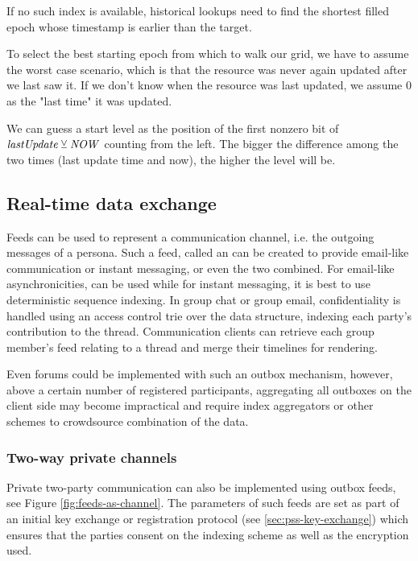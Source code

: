 If no such index is available, historical lookups need to find the shortest filled epoch whose timestamp is earlier than the target. 

To select the best starting epoch from which to walk our grid, we have to assume the worst case scenario, which is that the resource was never again updated after we last saw it. If we don't know when the resource was last updated, we assume 0 as the "last time" it was updated.

We can guess a start level as the position of the first nonzero bit of $\mathit{lastUpdate}\veebar \mathit{NOW}$ counting from the left. The bigger the difference among the two times (last update time and now), the higher the level will be.


\subsection{Real-time data exchange \statusyellow}\label{sec:feed-as-channel}

Feeds can be used to represent a communication channel, i.e. the outgoing messages of a persona. Such a feed, called an  can be created to provide email-like communication or instant messaging, or even the two combined. For email-like asynchronicities,  can be used while for instant messaging, it is best to use deterministic sequence indexing. 
In group chat or group email, confidentiality is handled using an access control trie over the data structure, indexing each party's contribution to the thread. Communication clients can retrieve each group member's feed relating to a thread and merge their timelines for rendering. 

Even forums could be implemented with such an outbox mechanism, however, above a certain number of registered participants, aggregating all outboxes on the client side may become impractical and require index aggregators or other schemes to crowdsource combination of the data.

\subsubsection{Two-way private channels}
 
Private two-party communication can also be implemented using outbox feeds, see Figure \ref{fig:feeds-as-channel}. The parameters of such feeds are set as part of an initial key exchange or registration protocol (see \ref{sec:pss-key-exchange}) which ensures that the parties consent on the indexing scheme as well as the encryption used. 


